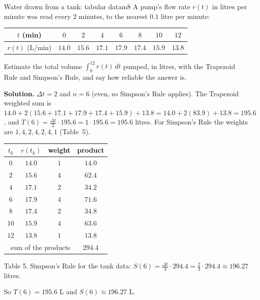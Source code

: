 \documentclass[11pt]{article}
\begin{document}
\begin{exmp}{Water drawn from a tank: tabular data}{m8}
A pump's flow rate $r(t)$ in litres per minute was read every $2$ minutes, to the nearest $0.1$ litre per minute:
\begin{center}
\begin{tabular}{c|ccccccc}
$t$ (min) & $0$ & $2$ & $4$ & $6$ & $8$ & $10$ & $12$\\\hline
$r(t)$ (L/min) & $14.0$ & $15.6$ & $17.1$ & $17.9$ & $17.4$ & $15.9$ & $13.8$\\
\end{tabular}
\end{center}
Estimate the total volume $\int_0^{12}r(t)\,dt$ pumped, in litres, with the Trapezoid Rule and Simpson's Rule, and say how reliable the answer is.

\textbf{Solution.} $\Delta t=2$ and $n=6$ (even, so Simpson's Rule applies). The Trapezoid weighted sum is $14.0+2(15.6+17.1+17.9+17.4+15.9)+13.8=14.0+2(83.9)+13.8=195.6$, and $T(6)=\frac{\Delta t}2\cdot195.6=1\cdot195.6=195.6$ litres. For Simpson's Rule the weights are $1,4,2,4,2,4,1$ (Table~5).
\begin{center}
\begin{tabular}{cccc}
\toprule $t_k$ & $r(t_k)$ & weight & product\\\midrule
$0$ & $14.0$ & $1$ & $14.0$\\
$2$ & $15.6$ & $4$ & $62.4$\\
$4$ & $17.1$ & $2$ & $34.2$\\
$6$ & $17.9$ & $4$ & $71.6$\\
$8$ & $17.4$ & $2$ & $34.8$\\
$10$ & $15.9$ & $4$ & $63.6$\\
$12$ & $13.8$ & $1$ & $13.8$\\\midrule
\multicolumn{3}{r}{sum of the products} & $294.4$\\\bottomrule
\end{tabular}
\end{center}
\begin{center}\small Table 5. Simpson's Rule for the tank data: $S(6)=\frac{\Delta t}3\cdot294.4=\frac23\cdot294.4\approx196.27$ litres.\end{center}
So $T(6)=195.6$ L and $S(6)\approx196.27$ L.


\end{exmp}
\end{document}
